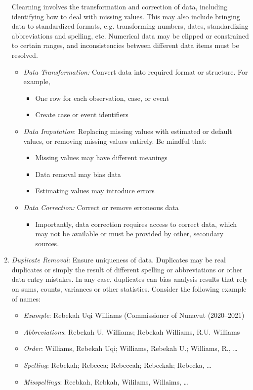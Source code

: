 \begin{enumerate}
Clearning involves the transformation and correction of data, including identifying how to deal with missing values. This may also include bringing data to standardized formats, e.g. transforming numbers, dates, standardizing abbreviations and spelling, etc. Numerical data may be clipped or constrained to certain ranges, and inconsistencies between different data items must be resolved.
\begin{itemize}
	\item \emph{Data Transformation:} Convert data into required format or structure. For example,
	\begin{itemize}
	  \item One row for each observation, case, or event
	  \item Create case or event identifiers
	\end{itemize}
	\item \emph{Data Imputation}: Replacing missing values with estimated or default values, or removing missing values entirely. Be mindful that:
	\begin{itemize}
	  \item Missing values may have different meanings
	  \item Data removal may bias data
	  \item Estimating values may introduce errors
	\end{itemize}
	\item \emph{Data Correction:} Correct or remove erroneous data
	\begin{itemize}
	  \item Importantly, data correction requires access to correct data, which may not be available or must be provided by other, secondary sources.
	\end{itemize}
\end{itemize}

\item \emph{Duplicate Removal:} Ensure uniqueness of data. Duplicates may be real duplicates or simply the result of different spelling or abbreviations or other data entry mistakes. In any case, duplicates can bias analysis results that rely on sums, counts, variances or other statistics. Consider the following example of names:
 \begin{itemize}
   \item \emph{Example}: Rebekah Uqi Williams (Commissioner of Nunavut (2020--2021)
   \item \emph{Abbreviations}: Rebekah U. Williams; Rebekah Williams, R.U. Williams
   \item \emph{Order}: Williams, Rebekah Uqi; Williams, Rebekah U.; Williams, R., \ldots
   \item \emph{Spelling}: Rebekah; Rebecca; Rebeccah; Rebeckah; Rebecka, \ldots
   \item \emph{Misspellings}: Reebkah, Rebkah, Wililams, Willaims, \ldots
 \end{itemize}


\end{enumerate}
